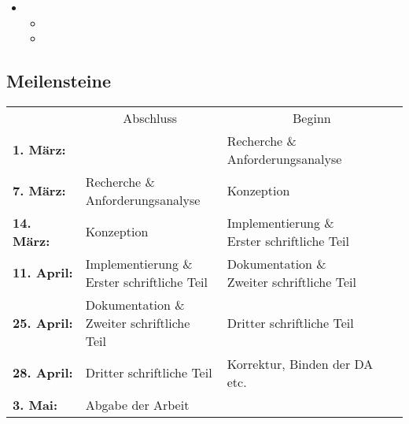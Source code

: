 \begin{itemize}
\begin{itemize}
          \begin{itemize}
            \item {}
            \item {}
          \end{itemize}
        \item {}
          \begin{itemize}
            \item {}
            \item {}
          \end{itemize}
      \end{itemize}
  \end{itemize}

  \subsection{Meilensteine}
  \label{ssec:meilensteine}
    \begin{table}[H]
      \begin{tabularx}{\textwidth}{lXX}
        {}
          & \multicolumn{1}{c}{Abschluss}
            & \multicolumn{1}{c}{Beginn}\\
        \cline{2-3}
        \textbf{1. März:}
          & {}
            & \specialcell[t]{Recherche \&\\Anforderungsanalyse}\\
        \textbf{7. März:}
          & \specialcell[t]{Recherche \&\\Anforderungsanalyse}
            & Konzeption\\
        \textbf{14. März:}
          & Konzeption
            & \specialcell[t]{Implementierung \&\\Erster schriftliche Teil}\\
        \textbf{11. April:}
          & \specialcell[t]{Implementierung \&\\Erster schriftliche Teil}
            & \specialcell[t]{Dokumentation \&\\Zweiter schriftliche Teil}\\
        \textbf{25. April:}
          & \specialcell[t]{Dokumentation \&\\Zweiter schriftliche Teil}
            & Dritter schriftliche Teil\\
        \textbf{28. April:}
          & Dritter schriftliche Teil
            & Korrektur, Binden der DA etc.\\
        \textbf{3. Mai:}
          & Abgabe der Arbeit
            &\\
      \end{tabularx}
    \end{table}
\pagebreak
